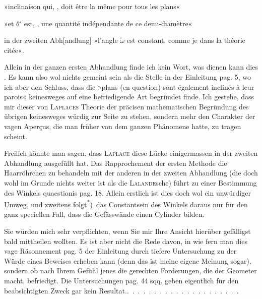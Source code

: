 \par\smallskip
\begin{list}{}{\setlength{\leftmargin}{5.2em}\setlength{\labelwidth}{4em}\setlength{\labelsep}{.5em}\setlength{\itemsep}{.3em}\setlength{\topsep}{0pt}}
\item[pag. 20] »inclinaison qui, , doit être la même pour
tous les plans«
\item[pag. 23] »et \(\theta'\) est, , une quantité indépendante de ce
demi-diamètre«
\item[pag. 14] in der zweiten Abh[andlung] »l’angle \(\tilde\omega\) est constant, comme je
 dans la théorie citée«.
\end{list}
\noindent Allein in der ganzen ersten Abhandlung  finde ich kein Wort, was
dienen kann dies . Es kann also wol nichts gemeint sein als
die Stelle in der Einleitung pag. 5, wo ich aber den Schluss, dass die »plans
(en question) sont également inclinés à leur parois« keinesweges auf eine befriedigende
Art begründet finde. Ich gestehe, dass mir dieser 
von \textsc{Laplaces} Theorie der präcisen mathematischen Begründung des übrigen
keinesweges würdig zur Seite zu stehen, sondern mehr den Charakter der vagen
Aperçus, die man früher von dem ganzen Phänomene hatte, zu tragen scheint.

Freilich könnte man sagen, dass \textsc{Laplace} diese Lücke einigermassen in
der zweiten Abhandlung ausgefüllt hat. Das Rapprochement der ersten Methode
die Haarröhrchen zu behandeln mit der anderen in der zweiten Abhandlung
(die doch wohl im Grunde nichts weiter ist als die \textsc{Lalande}sche)
führt zu einer Bestimmung des Winkels quaestionis pag. 18. Allein erstlich
ist dies doch wol ein unwürdiger Umweg, und zweitens folgt\textsuperscript{*})\begingroup\renewcommand{\thefootnote}{}\endgroup\ das Constantsein
des Winkels daraus nur für den ganz speciellen Fall, dass die Gefässwände
einen  Cylinder bilden.

Sie würden mich sehr verpflichten, wenn Sie mir Ihre Ansicht hierüber
gefälligst bald mittheilen wollten. Es ist aber nicht die Rede davon, in wie
\clearpage{}
\noindent fern man dies vage Räsonnement pag. 5 der Einleitung durch tiefere Untersuchung
zu der Würde eines Beweises erheben kann (denn das ist meine eigene
Meinung sogar), sondern ob nach Ihrem Gefühl jenes  die
gerechten Forderungen, die der Geometer macht, befriedigt. Die Untersuchungen
pag. 44 sqq. geben eigentlich für den beabsichtigten Zweck gar
kein Resultat.\quad .\ .\ .\ .\ .\ .\ .\ .\ .\ .\ .\ .\ .\ .\ .\ .\ .\ .\ .\ .\ .
\clearpage\endgroup
